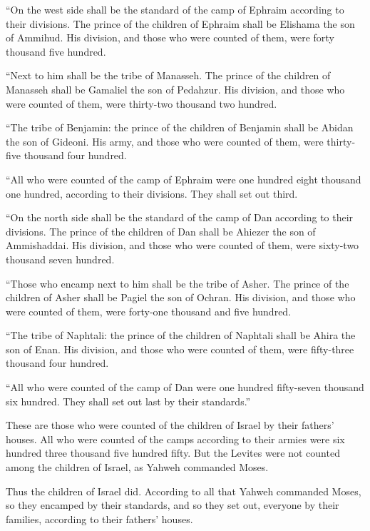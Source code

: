 {\par }{\PP {}“On the west side shall be the standard of the camp of Ephraim according to their divisions. The prince of the children of Ephraim shall be Elishama the son of Ammihud.
His division, and those who were counted of them, were forty thousand five hundred.
\par }{\PP {}“Next to him shall be the tribe of Manasseh. The prince of the children of Manasseh shall be Gamaliel the son of Pedahzur.
His division, and those who were counted of them, were thirty-two thousand two hundred.
\par }{\PP {}“The tribe of Benjamin: the prince of the children of Benjamin shall be Abidan the son of Gideoni.
His army, and those who were counted of them, were thirty-five thousand four hundred.
\par }{\PP {}“All who were counted of the camp of Ephraim were one hundred eight thousand one hundred, according to their divisions. They shall set out third.
\par }{\PP {}“On the north side shall be the standard of the camp of Dan according to their divisions. The prince of the children of Dan shall be Ahiezer the son of Ammishaddai.
His division, and those who were counted of them, were sixty-two thousand seven hundred.
\par }{\PP {}“Those who encamp next to him shall be the tribe of Asher. The prince of the children of Asher shall be Pagiel the son of Ochran.
His division, and those who were counted of them, were forty-one thousand and five hundred.
\par }{\PP {}“The tribe of Naphtali: the prince of the children of Naphtali shall be Ahira the son of Enan.
His division, and those who were counted of them, were fifty-three thousand four hundred.
\par }{\PP {}“All who were counted of the camp of Dan were one hundred fifty-seven thousand six hundred. They shall set out last by their standards.”
\par }{\PP {}These are those who were counted of the children of Israel by their fathers’ houses. All who were counted of the camps according to their armies were six hundred three thousand five hundred fifty.
But the Levites were not counted among the children of Israel, as Yahweh commanded Moses.
\par }{\PP {}Thus the children of Israel did. According to all that Yahweh commanded Moses, so they encamped by their standards, and so they set out, everyone by their families, according to their fathers’ houses.

}
